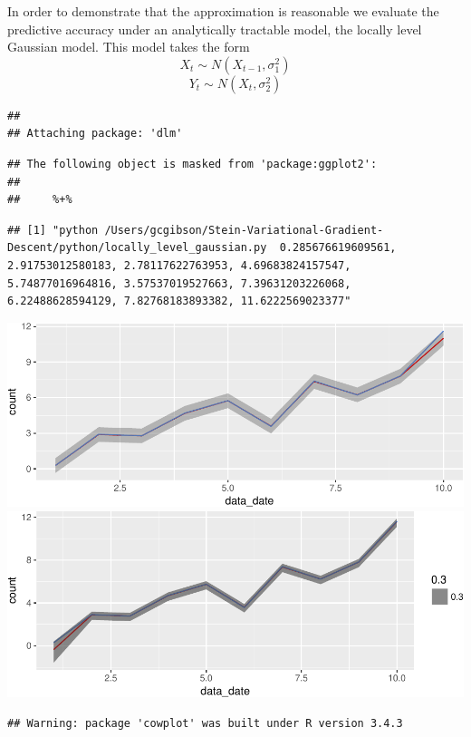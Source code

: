 \documentclass[]{article}
\begin{document}
In order to demonstrate that the approximation is reasonable we evaluate
the predictive accuracy under an analytically tractable model, the
locally level Gaussian model. This model takes the form
\[X_t \sim N(X_{t-1},\sigma_1^2)\] \[Y_t \sim N(X_t, \sigma_2^2)\]

\begin{verbatim}
## 
## Attaching package: 'dlm'
\end{verbatim}

\begin{verbatim}
## The following object is masked from 'package:ggplot2':
## 
##     %+%
\end{verbatim}

\begin{verbatim}
## [1] "python /Users/gcgibson/Stein-Variational-Gradient-Descent/python/locally_level_gaussian.py  0.285676619609561, 2.91753012580183, 2.78117622763953, 4.69683824157547, 5.74877016964816, 3.57537019527663, 7.39631203226068, 6.22488628594129, 7.82768183893382, 11.6222569023377"
\end{verbatim}

\includegraphics{ssvgd_files/figure-latex/unnamed-chunk-2-1.pdf}
\includegraphics{ssvgd_files/figure-latex/unnamed-chunk-2-2.pdf}

\begin{verbatim}
## Warning: package 'cowplot' was built under R version 3.4.3
\end{verbatim}
\end{document}
